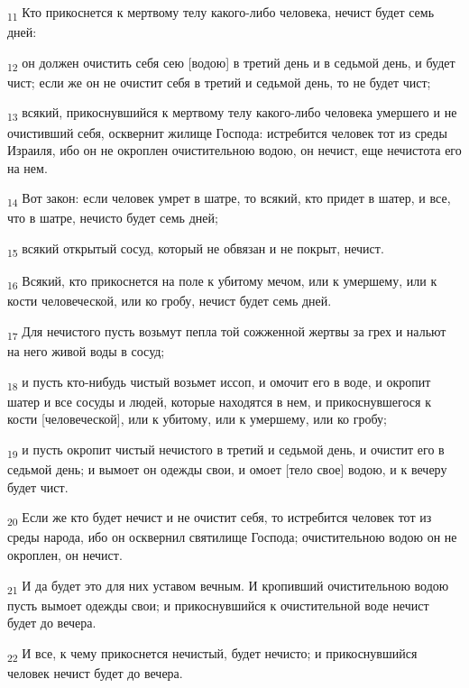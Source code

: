 \begin{tcolorbox}
\textsubscript{11} Кто прикоснется к мертвому телу какого-либо человека, нечист будет семь дней:
\end{tcolorbox}
\begin{tcolorbox}
\textsubscript{12} он должен очистить себя сею [водою] в третий день и в седьмой день, и будет чист; если же он не очистит себя в третий и седьмой день, то не будет чист;
\end{tcolorbox}
\begin{tcolorbox}
\textsubscript{13} всякий, прикоснувшийся к мертвому телу какого-либо человека умершего и не очистивший себя, осквернит жилище Господа: истребится человек тот из среды Израиля, ибо он не окроплен очистительною водою, он нечист, еще нечистота его на нем.
\end{tcolorbox}
\begin{tcolorbox}
\textsubscript{14} Вот закон: если человек умрет в шатре, то всякий, кто придет в шатер, и все, что в шатре, нечисто будет семь дней;
\end{tcolorbox}
\begin{tcolorbox}
\textsubscript{15} всякий открытый сосуд, который не обвязан и не покрыт, нечист.
\end{tcolorbox}
\begin{tcolorbox}
\textsubscript{16} Всякий, кто прикоснется на поле к убитому мечом, или к умершему, или к кости человеческой, или ко гробу, нечист будет семь дней.
\end{tcolorbox}
\begin{tcolorbox}
\textsubscript{17} Для нечистого пусть возьмут пепла той сожженной жертвы за грех и нальют на него живой воды в сосуд;
\end{tcolorbox}
\begin{tcolorbox}
\textsubscript{18} и пусть кто-нибудь чистый возьмет иссоп, и омочит его в воде, и окропит шатер и все сосуды и людей, которые находятся в нем, и прикоснувшегося к кости [человеческой], или к убитому, или к умершему, или ко гробу;
\end{tcolorbox}
\begin{tcolorbox}
\textsubscript{19} и пусть окропит чистый нечистого в третий и седьмой день, и очистит его в седьмой день; и вымоет он одежды свои, и омоет [тело свое] водою, и к вечеру будет чист.
\end{tcolorbox}
\begin{tcolorbox}
\textsubscript{20} Если же кто будет нечист и не очистит себя, то истребится человек тот из среды народа, ибо он осквернил святилище Господа; очистительною водою он не окроплен, он нечист.
\end{tcolorbox}
\begin{tcolorbox}
\textsubscript{21} И да будет это для них уставом вечным. И кропивший очистительною водою пусть вымоет одежды свои; и прикоснувшийся к очистительной воде нечист будет до вечера.
\end{tcolorbox}
\begin{tcolorbox}
\textsubscript{22} И все, к чему прикоснется нечистый, будет нечисто; и прикоснувшийся человек нечист будет до вечера.
\end{tcolorbox}
